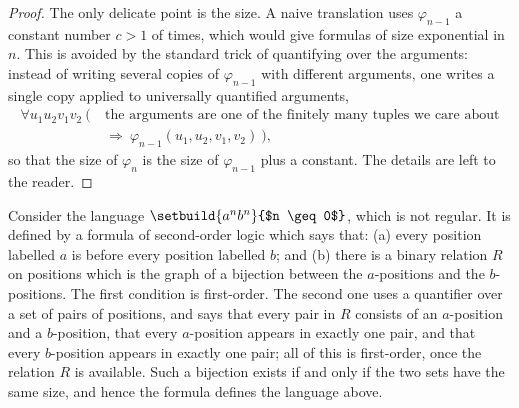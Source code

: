 {\begin{proof}
        The only delicate point is the size. A naive translation uses $\varphi_{n-1}$ a constant number $c > 1$ of times, which would give formulas of size exponential in $n$. This is avoided by the standard trick of quantifying over the arguments: instead of writing several copies of $\varphi_{n-1}$ with different arguments, one writes a single copy applied to universally quantified arguments,
        \begin{align*}
        \forall u_1 u_2 v_1 v_2 \ \big( \ & \text{the arguments are one of the finitely many tuples we care about} \\
        & \Rightarrow \ \varphi_{n-1}(u_1,u_2,v_1,v_2) \ \big),
        \end{align*}
        so that the size of $\varphi_n$ is the size of $\varphi_{n-1}$ plus a constant. The details are left to the reader.
    \end{proof}
}

{
Consider the language $\setbuild{a^nb^n}{$n \geq 0$}$, which is not regular. It is defined by a formula of second-order logic which says that: (a) every position labelled $a$ is before every position labelled $b$; and (b) there is a binary relation $R$ on positions which is the graph of a bijection between the $a$-positions and the $b$-positions. The first condition is first-order. The second one uses a quantifier over a set of pairs of positions, and says that every pair in $R$ consists of an $a$-position and a $b$-position, that every $a$-position appears in exactly one pair, and that every $b$-position appears in exactly one pair; all of this is first-order, once the relation $R$ is available. Such a bijection exists if and only if the two sets have the same size, and hence the formula defines the language above.
}


